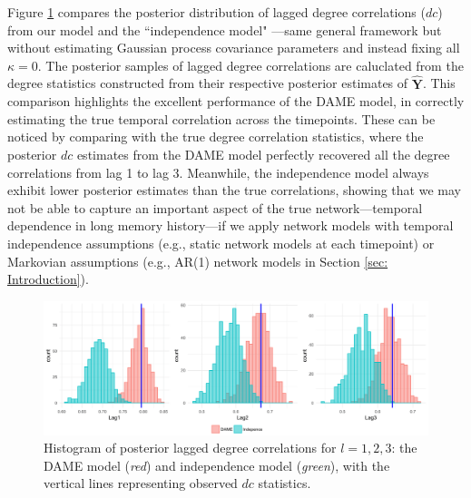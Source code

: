 \documentclass[a4paper]{article}
\begin{document}
 Figure \ref{figure:correlationstudy} compares the posterior distribution of lagged degree correlations ($dc$) from our model and the ``independence model" ---same general framework but without estimating Gaussian process covariance parameters and instead fixing all $\kappa = 0$. The posterior samples of lagged degree correlations are caluclated from the degree statistics constructed from their respective posterior estimates of $\hat{\mathbf{Y}}$. This comparison highlights the excellent performance of the DAME model, in correctly estimating the true temporal correlation across the timepoints. These can be noticed by comparing with the true degree correlation statistics, where the posterior $dc$ estimates from the DAME model perfectly recovered all the degree correlations from lag 1 to lag 3. Meanwhile, the independence model always exhibit lower posterior estimates than the true correlations, showing that we may not be able to capture an important aspect of the true network---temporal dependence in long memory history---if we apply network models with temporal independence assumptions (e.g., static network models at each timepoint) or Markovian assumptions (e.g., AR(1) network models in Section \ref{sec: Introduction}).
\begin{figure}[b]
	\centering
		\includegraphics[width=1\textwidth]{plots_paper/correlations-1.png}	
	\caption {Histogram of posterior lagged degree correlations for $l=1,2,3$: the DAME model (\textit{red}) and independence model (\textit{green}), with the vertical lines representing observed $dc$ statistics.}
	\label{figure:correlationstudy}
\end{figure}
\end{document}
